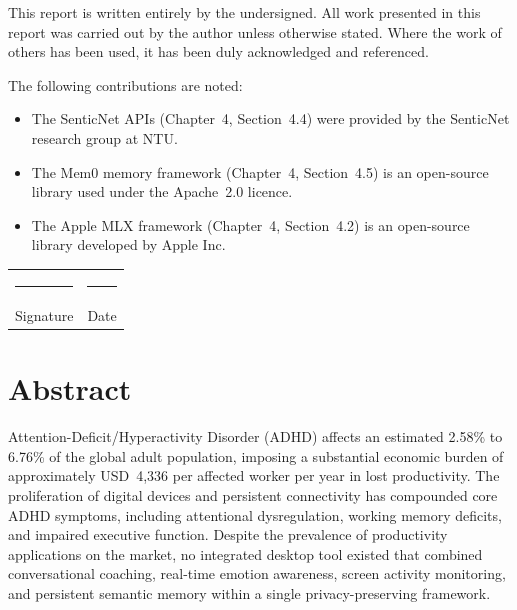 This report is written entirely by the undersigned. All work presented in this report was carried out by the author unless otherwise stated. Where the work of others has been used, it has been duly acknowledged and referenced.

The following contributions are noted:

\begin{itemize}[leftmargin=2cm]
  \item The SenticNet APIs (Chapter~4, Section~4.4) were provided by the SenticNet research group at NTU.
  \item The Mem0 memory framework (Chapter~4, Section~4.5) is an open-source library used under the Apache~2.0 licence.
  \item The Apple MLX framework (Chapter~4, Section~4.2) is an open-source library developed by Apple Inc.
\end{itemize}

\vspace{2cm}

\begin{tabular}{@{}ll}
  \rule{6cm}{0.4pt} & \rule{4cm}{0.4pt} \\
  Signature                & Date
\end{tabular}

\newpage

\chapter*{Abstract}

Attention-Deficit/Hyperactivity Disorder (ADHD) affects an estimated 2.58\% to 6.76\% of the global adult population, imposing a substantial economic burden of approximately USD~4,336 per affected worker per year in lost productivity. The proliferation of digital devices and persistent connectivity has compounded core ADHD symptoms, including attentional dysregulation, working memory deficits, and impaired executive function. Despite the prevalence of productivity applications on the market, no integrated desktop tool existed that combined conversational coaching, real-time emotion awareness, screen activity monitoring, and persistent semantic memory within a single privacy-preserving framework.

